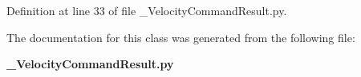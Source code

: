 \subsubsection[{success}]{}\label{classoryx__drive__controller_1_1msg_1_1__VelocityCommandResult_1_1VelocityCommandResult_aed78106f97103c5e53f35092b103434c}


\-Definition at line 33 of file \-\_\-\-Velocity\-Command\-Result.\-py.



\-The documentation for this class was generated from the following file\-:\begin{DoxyCompactItemize}
\item 
{\bf \-\_\-\-Velocity\-Command\-Result.\-py}\end{DoxyCompactItemize}
